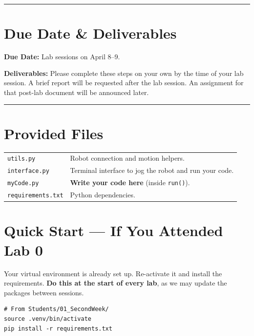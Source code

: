 \documentclass[11pt,a4paper]{article}
\begin{document}
\rule{\linewidth}{0.4pt}

\section*{Due Date \& Deliverables}

\textbf{Due Date:} Lab sessions on April 8--9.

\textbf{Deliverables:} Please complete these steps on your own by the time of your lab session.
A brief report will be requested after the lab session. An assignment for that post-lab document
will be announced later.

\rule{\linewidth}{0.4pt}

\section*{Provided Files}

\begin{tabular}{ll}
  \texttt{utils.py}         & Robot connection and motion helpers. \\
  \texttt{interface.py}     & Terminal interface to jog the robot and run your code. \\
  \texttt{myCode.py}        & \textbf{Write your code here} (inside \texttt{run()}). \\
  \texttt{requirements.txt} & Python dependencies. \\
\end{tabular}

\section*{Quick Start --- If You Attended Lab 0}

Your virtual environment is already set up. Re-activate it and install the requirements.
 \textbf{Do this at the start of every lab}, as we may update the packages between sessions.

\begin{tcolorbox}[setupbox, title={Linux / macOS}]
\begin{lstlisting}[style=code]
# From Students/01_SecondWeek/
source .venv/bin/activate
pip install -r requirements.txt
\end{lstlisting}
\end{tcolorbox}
\end{document}
